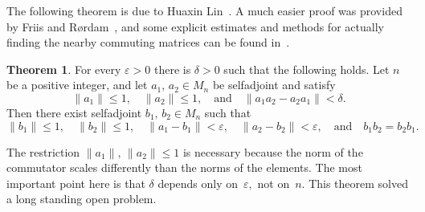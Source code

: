 \documentclass[10pt]{amsart}
\theoremstyle{definition}
\newtheorem{thm}{Theorem}[section]
\newcommand{\dt}{\delta}
\newcommand{\ep}{\varepsilon}
\newcommand{\sa}{{\mathrm{sa}}}
\newcommand{\andeqn}{\,\,\,\,\,\, {\mbox{and}} \,\,\,\,\,\,}
\begin{document}
The following theorem is due to Huaxin Lin~\cite{Ln}.
A much easier proof was provided by Friis and R{\o}rdam~\cite{FR},
and some explicit estimates
and methods for actually finding
the nearby commuting matrices can be found in~\cite{Hs}.

\begin{thm}\label{SA}
For every $\ep > 0$ there is $\dt > 0$ such that the following holds.
Let $n$ be a positive integer, and let $a_1, \, a_2 \in M_n$
be selfadjoint and
satisfy
\[
\| a_1 \| \leq 1, \,\,\,\,\,\, \| a_2 \| \leq 1, \andeqn
\| a_1 a_2 - a_2 a_1 \| < \dt.
\]
Then there exist selfadjoint $b_1, \, b_2 \in M_n$
such that
\[
\| b_1 \| \leq 1, \,\,\,\,\,\, \| b_2 \| \leq 1, \,\,\,\,\,\,
\| a_1 - b_1 \| < \ep,  \,\,\,\,\,\, \| a_2 - b_2 \| < \ep,
\andeqn b_1 b_2 = b_2 b_1.
\]
\end{thm}

The restriction $\| a_1 \|, \, \| a_2 \| \leq 1$ is necessary because
the norm of the commutator scales differently than the norms of the
elements.
The most important point here is that $\dt$ depends only on~$\ep,$
not on~$n.$
This theorem solved a long standing open problem.
\end{document}
